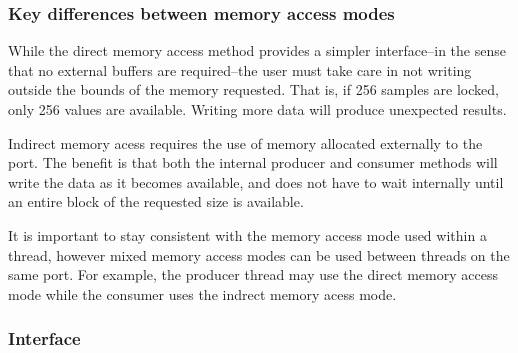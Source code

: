 

\subsubsection{Key differences between memory access modes}
While the direct memory access method provides a simpler interface--in the
sense that no external buffers are required--the user must take care in not
writing outside the bounds of the memory requested.
That is, if 256 samples are locked, only 256 values are available.
Writing more data will produce unexpected results.

Indirect memory acess requires the use of memory allocated externally to the
port.
The benefit is that both the internal producer and consumer methods will write
the data as it becomes available, and does not have to wait internally until
an entire block of the requested size is available.

It is important to stay consistent with the memory access mode used within a
thread, however mixed memory access modes can be used between threads on the
same port.
For example, the producer thread may use the direct memory access mode while
the consumer uses the indrect memory acess mode.

\subsubsection{Interface}
\label{module:buffer:gport:interface}

